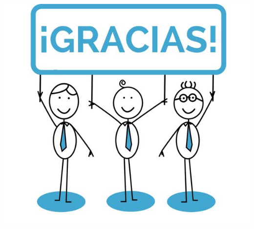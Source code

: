 \documentclass[11pt,spanish,a4paper,oneside,]{book} %
\begin{document}

\includegraphics{figures/uvalogo_regular_p_en.pdf}

\backmatter
\end{document}
